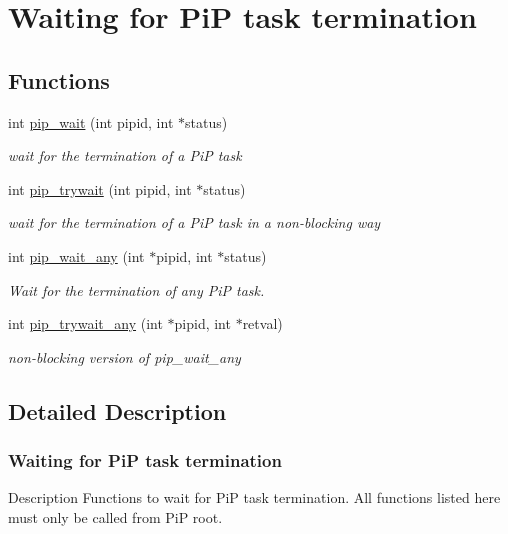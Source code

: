 \hypertarget{group__pip-3-wait}{\section{Waiting for Pi\-P task termination}
\label{group__pip-3-wait}
}
\subsection*{Functions}
\begin{DoxyCompactItemize}
\item 
int \hyperlink{group__pip-3-wait_gae04520bc29d3ec85d7090f7e645de27d}{pip\-\_\-wait} (int pipid, int $\ast$status)
\begin{DoxyCompactList}\small\item\em wait for the termination of a Pi\-P task \end{DoxyCompactList}\item 
int \hyperlink{group__pip-3-wait_ga9e786d15401af041842f3f503c962a4b}{pip\-\_\-trywait} (int pipid, int $\ast$status)
\begin{DoxyCompactList}\small\item\em wait for the termination of a Pi\-P task in a non-\/blocking way \end{DoxyCompactList}\item 
int \hyperlink{group__pip-3-wait_ga621bba73fda6b2bbe3c04e0c65006d36}{pip\-\_\-wait\-\_\-any} (int $\ast$pipid, int $\ast$status)
\begin{DoxyCompactList}\small\item\em Wait for the termination of any Pi\-P task. \end{DoxyCompactList}\item 
int \hyperlink{group__pip-3-wait_ga65731447fedb85cbe4d5c38093383a20}{pip\-\_\-trywait\-\_\-any} (int $\ast$pipid, int $\ast$retval)
\begin{DoxyCompactList}\small\item\em non-\/blocking version of {\ttfamily pip\-\_\-wait\-\_\-any} \end{DoxyCompactList}\end{DoxyCompactItemize}


\subsection{Detailed Description}
\hypertarget{pip-wait}{}\subsubsection{Waiting for Pi\-P task termination}\label{pip-wait}
\begin{DoxyParagraph}{Description}
Functions to wait for Pi\-P task termination. All functions listed here must only be called from Pi\-P root. 
\end{DoxyParagraph}


